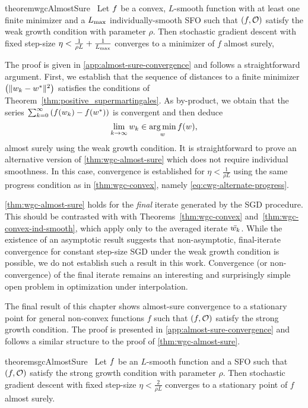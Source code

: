 \begin{restatable}{theorem}{wgcAlmostSure}~\label{thm:wgc-almost-sure}
    Let \( \f \) be a convex, \( L \)-smooth function with at least one finite minimizer and \oracle{} a \( \Lmax \) individually-smooth \ac{SFO} such that \( \rbr{f, \oracle{}} \) satisfy the weak growth condition with parameter \( \rho \).
    Then stochastic gradient descent with fixed step-size \( \eta < \frac{1}{\rho L} + \frac{1}{\Lmax} \) converges to a minimizer of \( f \) almost surely,
\end{restatable}

The proof is given in \autoref{app:almost-sure-convergence} and follows a straightforward argument.
First, we establish that the sequence of distances to a finite minimizer \( \seq{\norm{\wk - \wopt}^2} \) satisfies the conditions of Theorem~\ref{thm:positive_supermartingales}.
As by-product, we obtain that the series \( \sum_{k=0}^{\infty} \rbr{f(\wk) - f(\wopt)} \) is convergent and then deduce
\[ \lim_{k\rightarrow\infty} \wk \in \argmin_w f(\w), \] 
almost surely using the weak growth condition.
It is straightforward to prove an alternative version of \autoref{thm:wgc-almost-sure} which does not require individual smoothness.
In this case, convergence is established for \( \eta < \frac{1}{\rho L} \) using the same progress condition as in \autoref{thm:wgc-convex}, namely \autoref{eq:cwg-alternate-progress}.

\autoref{thm:wgc-almost-sure} holds for the \emph{final} iterate generated by the \ac{SGD} procedure.
This should be contrasted with with Theorems~\ref{thm:wgc-convex} and~\ref{thm:wgc-convex-ind-smooth}, which apply only to the averaged iterate \( \bar \wk \).
While the existence of an asymptotic result suggests that non-asymptotic, final-iterate convergence for constant step-size \ac{SGD} under the weak growth condition is possible, we do not establish such a result in this work. 
Convergence (or non-convergence) of the final iterate remains an interesting and surprisingly simple open problem in optimization under interpolation.

The final result of this chapter shows almost-sure convergence to a stationary point for general non-convex functions \( f \) such that \( \rbr{f, \oracle{}} \) satisfy the strong growth condition.
The proof is presented in \autoref{app:almost-sure-convergence} and follows a similar structure to the proof of \autoref{thm:wgc-almost-sure}.

\begin{restatable}{theorem}{sgcAlmostSure}~\label{thm:sgc-almost-sure}
    Let \( \f \) be an \( L \)-smooth function and \oracle{} a SFO such that \( \rbr{f, \oracle{}} \) satisfy the strong growth condition with parameter \( \rho \).
    Then stochastic gradient descent with fixed step-size \(\eta < \frac{2}{\rho L} \) converges to a stationary point of \( f \) almost surely.
\end{restatable}

\endinput

